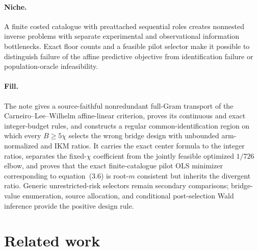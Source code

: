 \documentclass{article}
\begin{document}
\paragraph{Niche.} A finite costed catalogue with preattached sequential roles creates nonnested inverse problems with separate experimental and observational information bottlenecks.  Exact floor counts and a feasible pilot selector make it possible to distinguish failure of the affine predictive objective from identification failure or population-oracle infeasibility.

\paragraph{Fill.} The note gives a source-faithful nonredundant full-Gram transport of the Carneiro--Lee--Wilhelm affine-linear criterion, proves its continuous and exact integer-budget rules, and constructs a regular common-identification region on which every \(B\ge5\chi\) selects the wrong bridge design with unbounded arm-normalized and IKM ratios.  It carries the exact center formula to the integer ratios, separates the fixed-\(\chi\) coefficient from the jointly feasible optimized \(1/726\) elbow, and proves that the exact finite-catalogue pilot OLS minimizer corresponding to equation~(3.6) is root-\(m\) consistent but inherits the divergent ratio.  Generic unrestricted-risk selectors remain secondary comparisons; bridge-value enumeration, source allocation, and conditional post-selection Wald inference provide the positive design rule.

\section{Related work}
\end{document}
